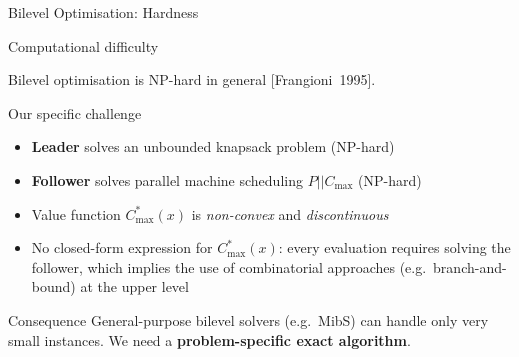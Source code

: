 \documentclass[fleqn,11pt,aspectratio=43]{beamer}
\newcommand{\Cmax}{C_{\max}}
\newcommand{\Copt}{C_{\max}^{*}}
\begin{document}
\begin{frame}[shrink=5]{Bilevel Optimisation: Hardness}
  \begin{alertblock}{Computational difficulty}

























    Bilevel optimisation is NP-hard in general [Frangioni~1995].






















  \end{alertblock}
  \begin{block}{Our specific challenge}
    \begin{itemize}
      \item \textbf{Leader} solves an unbounded knapsack problem (NP-hard)
      \item \textbf{Follower} solves parallel machine scheduling $P||\Cmax$ (NP-hard)
      \item Value function $\Copt(x)$ is \emph{non-convex} and \emph{discontinuous}
      \item No closed-form expression for $\Copt(x)$: every evaluation requires solving the follower, which implies the use of combinatorial approaches (e.g.\ branch-and-bound) at the upper level
    \end{itemize}
  \end{block}
  \begin{block}{Consequence}
    General-purpose bilevel solvers (e.g.\ MibS) can handle only very small instances.
    We need a \textbf{problem-specific exact algorithm}.
  \end{block}
\end{frame}
\end{document}
